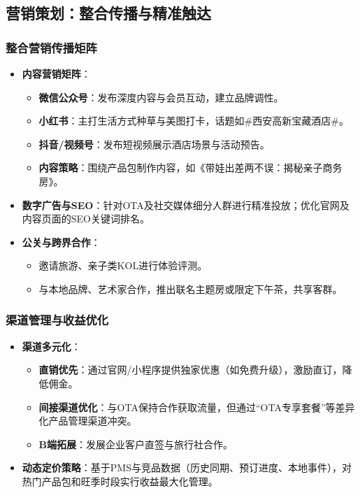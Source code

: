 \documentclass{cumcmthesis}
\begin{document}
\subsection{营销策划：整合传播与精准触达}
\subsubsection{整合营销传播矩阵}
\begin{itemize}
    \item \textbf{内容营销矩阵}：
    \begin{itemize}
        \item \textbf{微信公众号}：发布深度内容与会员互动，建立品牌调性。
        \item \textbf{小红书}：主打生活方式种草与美图打卡，话题如\#西安高新宝藏酒店\#。
        \item \textbf{抖音/视频号}：发布短视频展示酒店场景与活动预告。
        \item \textbf{内容策略}：围绕产品包制作内容，如《带娃出差两不误：揭秘亲子商务房》。
    \end{itemize}
    \item \textbf{数字广告与SEO}：针对OTA及社交媒体细分人群进行精准投放；优化官网及内容页面的SEO关键词排名。
    \item \textbf{公关与跨界合作}：
    \begin{itemize}
        \item 邀请旅游、亲子类KOL进行体验评测。
        \item 与本地品牌、艺术家合作，推出联名主题房或限定下午茶，共享客群。
    \end{itemize}
\end{itemize}

\subsubsection{渠道管理与收益优化}
\begin{itemize}
    \item \textbf{渠道多元化}：
    \begin{itemize}
        \item \textbf{直销优先}：通过官网/小程序提供独家优惠（如免费升级），激励直订，降低佣金。
        \item \textbf{间接渠道优化}：与OTA保持合作获取流量，但通过“OTA专享套餐”等差异化产品管理渠道冲突。
        \item \textbf{B端拓展}：发展企业客户直签与旅行社合作。
    \end{itemize}
    \item \textbf{动态定价策略}：基于PMS与竞品数据（历史同期、预订进度、本地事件），对热门产品包和旺季时段实行收益最大化管理。
\end{itemize}
\end{document}
